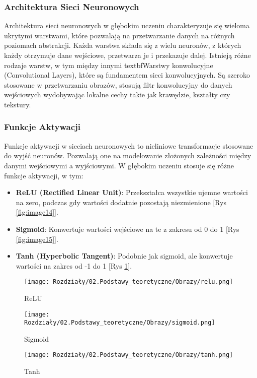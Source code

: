 \subsubsection*{Architektura Sieci Neuronowych}
Architektura sieci neuronowych w głębokim uczeniu charakteryzuje się wieloma ukrytymi warstwami, które pozwalają na przetwarzanie danych na różnych poziomach abstrakcji. Każda warstwa składa się z wielu neuronów, z których każdy otrzymuje dane wejściowe, przetwarza je i przekazuje dalej. Istnieją różne rodzaje warstw, w tym między innymi textbf{Warstwy konwolucyjne (Convolutional Layers)}, które są fundamentem sieci konwolucyjnych. Są szeroko stosowane w przetwarzaniu obrazów, stosują filtr konwolucyjny do danych wejściowych wydobywając lokalne cechy takie jak krawędzie, kształty czy tekstury.


\subsubsection*{Funkcje Aktywacji}
Funkcje aktywacji w sieciach neuronowych to nieliniowe transformacje stosowane do wyjść neuronów. Pozwalają one na modelowanie złożonych zależności między danymi wejściowymi a wyjściowymi. W głębokim uczeniu stosuje się różne funkcje aktywacji, w tym:
\begin{itemize}
    \item \textbf{ReLU (Rectified Linear Unit)}: Przekształca wszystkie ujemne wartości na zero, podczas gdy wartości dodatnie pozostają niezmienione  [Rys \ref{fig:image14}].
    \item \textbf{Sigmoid}: Konwertuje wartości wejściowe na te z zakresu od 0 do 1 [Rys \ref{fig:image15}].
    \item \textbf{Tanh (Hyperbolic Tangent)}: Podobnie jak sigmoid, ale konwertuje wartości na zakres od -1 do 1 [Rys \ref{fig:image16}].
\end{itemize}

\begin{figure}[H]
    \centering
    \begin{minipage}[t]{0.27\linewidth}
        \texttt{[image: Rozdziały/02.Podstawy\_teoretyczne/Obrazy/relu.png]}
        \caption{ReLU}
        \label{fig:image14}
    \end{minipage}
    \hspace{0.5cm}
    \begin{minipage}[t]{0.27\linewidth}
        \texttt{[image: Rozdziały/02.Podstawy\_teoretyczne/Obrazy/sigmoid.png]}
        \caption{Sigmoid}
        \label{fig:image15}
    \end{minipage}
    \hspace{0.5cm}
    \begin{minipage}[t]{0.27\linewidth}
        \texttt{[image: Rozdziały/02.Podstawy\_teoretyczne/Obrazy/tanh.png]}
        \caption{Tanh}
        \label{fig:image16}
    \end{minipage}
\end{figure}


